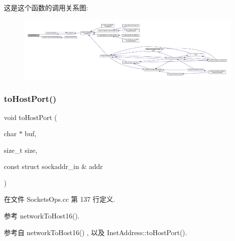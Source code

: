 这是这个函数的调用关系图\+:
\nopagebreak
\begin{figure}[H]
\begin{center}
\leavevmode
\includegraphics[width=350pt]{namespacemuduo_1_1sockets_a549ec5e856fec6f111aeb481cca9e622_icgraph}
\end{center}
\end{figure}
\mbox{\label{namespacemuduo_1_1sockets_adbdc909d04fd53860d9175b51755b0ae}} 
\subsubsection{\texorpdfstring{to\+Host\+Port()}{toHostPort()}}
{\footnotesize\ttfamily void to\+Host\+Port (\begin{DoxyParamCaption}\item[{char $\ast$}]{buf,  }\item[{size\+\_\+t}]{size,  }\item[{const struct sockaddr\+\_\+in \&}]{addr }\end{DoxyParamCaption})}



在文件 Sockets\+Ops.\+cc 第 137 行定义.



参考 network\+To\+Host16().



参考自 network\+To\+Host16() , 以及 Inet\+Address\+::to\+Host\+Port().

